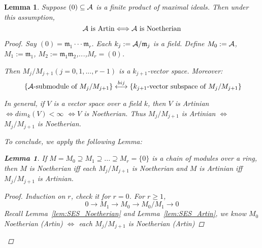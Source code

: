 \documentclass[11pt]{article}
\newtheorem{lemma}[thm]{Lemma}
\newcommand{\scm}{{\mathfrak m}}
\newcommand{\cala}{{\cal A}}
\newcommand{\lrta}{\longrightarrow}
\newcommand{\llrta}{\longleftrightarrow}
\newcommand{\Llrta}{\Longleftrightarrow}
\begin{document}
\begin{lemma}\label{lem:Artin_Noetherin_product_of_maximals}
Suppose $(0)\subseteq \cala$ is a finite product of maximal ideals. Then under this assumption, 
$$
\cala\text{ is Artin}\Llrta \cala\text{ is Noetherian}
$$
\begin{proof}
Say $(0)=\scm_1\cdot \cdot \cdot \scm_r$. Each $k_j:=\cala/\scm_j$ is a field. Define $M_0:=\cala$, $M_1:=\scm_1$, $M_2:=\scm_1\scm_2$,...,$M_r=(0)$.

Then $M_j/M_{j+1} (j=0,1,...,r-1)$ is a $k_{j+1}$-vector space. Moreover: 
$$
\text{
\{$\cala$-submodule of $M_j/M_{j+1}$\}}
\overset{bij}{\llrta}
\text{\{$k_{j+1}$-vector subspace of $M_j/M_{j+1}$\}}
$$

In general, if $V$ is a vector space over a field $k$, then $V$ is Artinian   $\Llrta dim_k(V)<\infty$ $\Llrta V$ is Noetherian. Thus $M_j/M_{j+1}$ is Artinian   $\Llrta$ $M_j/M_{j+1}$ is Noetherian.

To conclude, we apply the following Lemma:
\begin{lemma}
If $M=M_0\supseteq M_1\supseteq ...\supseteq M_r=\{0\}$ is a chain of modules over a ring, then $M$ is Noetherian iff each $M_j/M_{j+1}$ is Noetherian and $M$ is Artinian   iff $M_j/M_{j+1}$ is Artinian. 
\begin{proof}
Induction on $r$, check it for $r=0$.
For $r\geq 1$, 
$$
0\lrta M_1\lrta M_0\lrta M_0/M_1\lrta 0
$$ Recall Lemma~\ref{lem:SES_Noetherian} and Lemma~\ref{lem:SES_Artin}, we know $M_0$ Noetherian (Artin) $\Llrta$ each $M_j/M_{j+1}$ is Noetherian (Artin)
\end{proof}
\end{lemma}
\end{proof}
\end{lemma}
\end{document}
